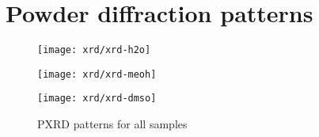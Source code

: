 
\FloatBarrier%
\section{Powder diffraction patterns}\label{appx:def:xrd}

\begin{figure}[!h]
    \centering

    \texttt{[image: xrd/xrd-h2o]}

    \texttt{[image: xrd/xrd-meoh]}

    \texttt{[image: xrd/xrd-dmso]}

    \caption{PXRD patterns for all samples}%
    \label{appx:def:fgr:xrd}
\end{figure}
